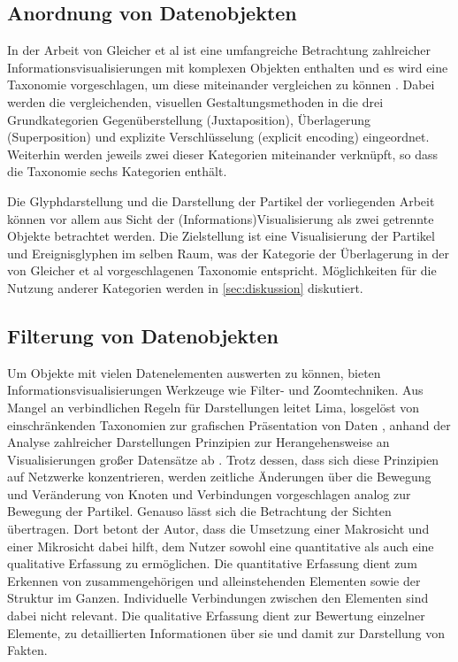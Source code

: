 \subsection*{Anordnung von Datenobjekten}\label{sec:related-visAnordnung}
In der Arbeit von Gleicher et al ist eine umfangreiche Betrachtung zahlreicher Informationsvisualisierungen mit komplexen Objekten enthalten und es wird eine Taxonomie vorgeschlagen, um diese miteinander vergleichen zu können \cite{gleicher2011visualComparison}. Dabei werden die vergleichenden, visuellen Gestaltungsmethoden in die drei Grundkategorien Gegenüberstellung (Juxtaposition), Überlagerung (Superposition) und explizite Verschlüsselung (explicit encoding) eingeordnet. Weiterhin werden jeweils zwei dieser Kategorien miteinander verknüpft, so dass die Taxonomie sechs Kategorien enthält. %

Die Glyphdarstellung und die Darstellung der Partikel der vorliegenden Arbeit können vor allem aus Sicht der (Informations)Visualisierung als zwei getrennte Objekte betrachtet werden. Die Zielstellung ist eine Visualisierung der Partikel und Ereignisglyphen im selben Raum, was der Kategorie der Überlagerung in der von Gleicher et al vorgeschlagenen Taxonomie entspricht. Möglichkeiten für die Nutzung anderer Kategorien werden in \autoref{sec:diskussion} diskutiert. %

\subsection*{Filterung von Datenobjekten}\label{sec:related-visFilter}
Um Objekte mit vielen Datenelementen auswerten zu können, bieten Informationsvisualisierungen Werkzeuge wie Filter- und Zoomtechniken. Aus Mangel an verbindlichen Regeln für Darstellungen leitet Lima, losgelöst von einschränkenden Taxonomien zur grafischen Präsentation von Daten \cite{brinton1914graphicMethods}, anhand der Analyse zahlreicher Darstellungen \cite{lima2015visualComplexity_web} Prinzipien zur Herangehensweise an Visualisierungen großer Datensätze ab \cite[S.~81-95]{lima2013visualComplexity}. Trotz dessen, dass sich diese Prinzipien auf Netzwerke konzentrieren, werden zeitliche Änderungen über die Bewegung und Veränderung von Knoten und Verbindungen vorgeschlagen analog zur Bewegung der Partikel. Genauso lässt sich die Betrachtung der Sichten übertragen. Dort betont der Autor, dass die Umsetzung einer Makrosicht und einer Mikrosicht dabei hilft, dem Nutzer sowohl eine quantitative als auch eine qualitative Erfassung zu ermöglichen. Die quantitative Erfassung dient zum Erkennen von zusammengehörigen und alleinstehenden Elementen sowie der Struktur im Ganzen. Individuelle Verbindungen zwischen den Elementen sind dabei nicht relevant. Die qualitative Erfassung dient zur Bewertung einzelner Elemente, zu detaillierten Informationen über sie und damit zur Darstellung von Fakten. %

